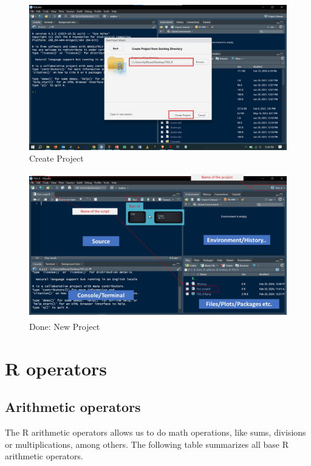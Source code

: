 \documentclass[
]{book}
\begin{document}
\begin{figure}

{\centering \includegraphics[width=0.7\linewidth]{pictures/Slide11} 

}

\caption{Create Project}\label{fig:unnamed-chunk-9}
\end{figure}

\begin{figure}

{\centering \includegraphics[width=0.7\linewidth]{pictures/Slide12} 

}

\caption{Done: New Project}\label{fig:unnamed-chunk-10}
\end{figure}

\hypertarget{r-operators}{%
\chapter{R operators}\label{r-operators}}

\hypertarget{arithmetic-operators}{%
\section{Arithmetic operators}\label{arithmetic-operators}}

The R arithmetic operators allows us to do math operations, like sums, divisions or multiplications, among others. The following table summarizes all base R arithmetic operators.
\end{document}
